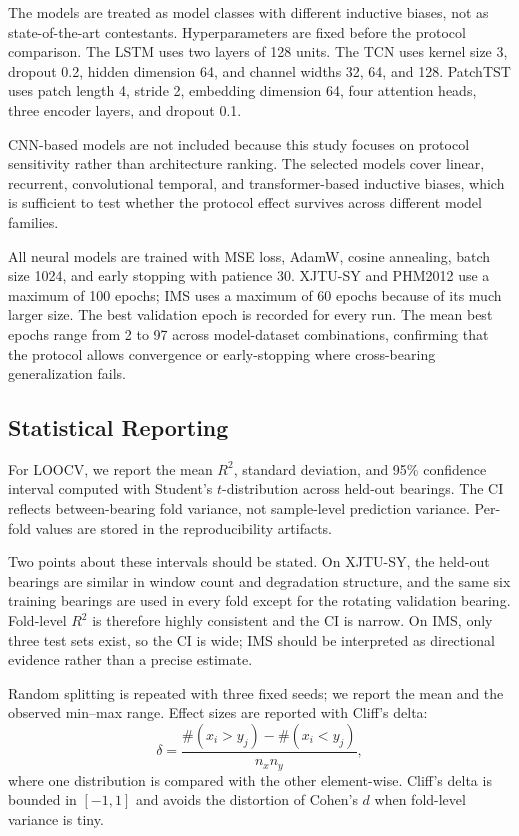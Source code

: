 \documentclass[5p,twocolumn]{elsarticle}
\begin{document}
The models are treated as model classes with different inductive biases, not as state-of-the-art contestants. Hyperparameters are fixed before the protocol comparison. The LSTM uses two layers of 128 units. The TCN uses kernel size 3, dropout 0.2, hidden dimension 64, and channel widths 32, 64, and 128. PatchTST uses patch length 4, stride 2, embedding dimension 64, four attention heads, three encoder layers, and dropout 0.1.

CNN-based models are not included because this study focuses on protocol sensitivity rather than architecture ranking. The selected models cover linear, recurrent, convolutional temporal, and transformer-based inductive biases, which is sufficient to test whether the protocol effect survives across different model families.

All neural models are trained with MSE loss, AdamW, cosine annealing, batch size 1024, and early stopping with patience 30. XJTU-SY and PHM2012 use a maximum of 100 epochs; IMS uses a maximum of 60 epochs because of its much larger size. The best validation epoch is recorded for every run. The mean best epochs range from 2 to 97 across model-dataset combinations, confirming that the protocol allows convergence or early-stopping where cross-bearing generalization fails.

\subsection{Statistical Reporting}
For LOOCV, we report the mean $R^2$, standard deviation, and 95\% confidence interval computed with Student's $t$-distribution across held-out bearings. The CI reflects between-bearing fold variance, not sample-level prediction variance. Per-fold values are stored in the reproducibility artifacts.

Two points about these intervals should be stated. On XJTU-SY, the held-out bearings are similar in window count and degradation structure, and the same six training bearings are used in every fold except for the rotating validation bearing. Fold-level $R^2$ is therefore highly consistent and the CI is narrow. On IMS, only three test sets exist, so the CI is wide; IMS should be interpreted as directional evidence rather than a precise estimate.

Random splitting is repeated with three fixed seeds; we report the mean and the observed min--max range. Effect sizes are reported with Cliff's delta:
\begin{equation}
\delta = \frac{\#(x_i > y_j) - \#(x_i < y_j)}{n_x n_y},
\label{eq:cliff}
\end{equation}
where one distribution is compared with the other element-wise. Cliff's delta is bounded in $[-1, 1]$ and avoids the distortion of Cohen's $d$ when fold-level variance is tiny.
\end{document}
